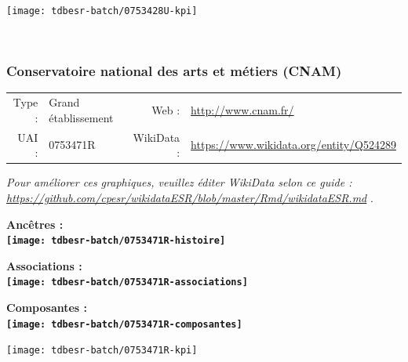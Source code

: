 \documentclass[12pt,french,]{article}
\begin{document}
\begin{center}\texttt{[image: tdbesr-batch/0753428U-kpi]} \end{center}\checkoddpage

\ifoddpage \fi ~\newpage  

\hypertarget{conservatoire-national-des-arts-et-muxe9tiers-cnam}{%
\subsubsection{Conservatoire national des arts et métiers
(CNAM)}\label{conservatoire-national-des-arts-et-muxe9tiers-cnam}}

\begin{tabular*}{\textwidth}{rp{5cm}rl}  
\hline  
Type : & Grand établissement & Web : &\href{http://www.cnam.fr/}{http://www.cnam.fr/} \\  
UAI : & 0753471R & WikiData : & \href{https://www.wikidata.org/entity/Q524289}{https://www.wikidata.org/entity/Q524289} \\  
\hline  
\end{tabular*}

\textit{\scriptsize Pour améliorer ces graphiques, veuillez éditer WikiData selon ce guide :  \href{https://github.com/cpesr/wikidataESR/blob/master/Rmd/wikidataESR.md}{https://github.com/cpesr/wikidataESR/blob/master/Rmd/wikidataESR.md}}
.

\vspace{1cm}  
\begin{minipage}[b]{0.50\textwidth}\begin{center} \bf Ancêtres : \\  
\texttt{[image: tdbesr-batch/0753471R-histoire]} \end{center}\end{minipage}\begin{minipage}[b]{0.50\textwidth}\begin{center} \bf Associations : \\  
\texttt{[image: tdbesr-batch/0753471R-associations]} \end{center}\end{minipage}

\hrulefill

\begin{center} \bf Composantes : \\  
\texttt{[image: tdbesr-batch/0753471R-composantes]} \end{center}

\begin{center}\texttt{[image: tdbesr-batch/0753471R-kpi]} \end{center}\checkoddpage
\end{document}
